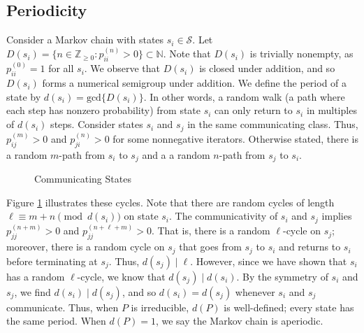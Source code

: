 \documentclass[11pt,letterpaper]{amsart}
\newcommand{\iterate}[2]{#1^{(#2)}}
\begin{document}
\subsection{Periodicity}
Consider a Markov chain with states $s_i \in \mathcal{S}$. Let
$D(s_i) = \{n\in \mathbb{Z}_{\geq 0} : \iterate{p}{n}_{ii} > 0 \} \subset
\mathbb{N}$. Note that $D(s_i)$ is trivially nonempty, as
$\iterate{p}{0}_{ii} = 1$ for all $s_i$. We observe that $D(s_i)$ is closed
under addition, and so $D(s_i)$ forms a numerical semigroup under addition. We
define the period of a state by $d(s_i)=\text{gcd}\{D(s_i)\}$. In other words, a
random walk (a path where each step has nonzero probability) from state $s_i$
can only return to $s_i$ in multiples of $d(s_i)$ steps. Consider states $s_i$
and $s_j$ in the same communicating class. Thus, $\iterate{p}{m}_{ij} > 0$ and
$\iterate{p}{n}_{ji} > 0$ for some nonnegative iterators. Otherwise stated,
there is a random $m$-path from $s_i$ to $s_j$ and a a random $n$-path from
$s_j$ to $s_i$.
\begin{figure}[h]
  \centering {}
  \caption{Communicating States}
  \label{fig:markov}
\end{figure}

Figure \ref{fig:markov} illustrates these cycles. Note that there are random
cycles of length $\ell \equiv m+n \pmod{d(s_i)}$ on state $s_i$. The
communicativity of $s_i$ and $s_j$ implies $\iterate{p}{n+m}_{jj} > 0$ and
$\iterate{p}{n + \ell + m}_{jj} > 0$. That is, there is a random $\ell$-cycle on
$s_j$; moreover, there is a random cycle on $s_j$ that goes from $s_j$ to $s_i$
and returns to $s_i$ before terminating at $s_j$. Thus, $d(s_j) \mid \ell$.
However, since we have shown that $s_i$ has a random $\ell$-cycle, we know that
$d(s_j) \mid d(s_i)$. By the symmetry of $s_i$ and $s_j$, we find
$d(s_i) \mid d(s_j)$, and so $d(s_i) = d(s_j)$ whenever $s_i$ and $s_j$
communicate. Thus, when $P$ is irreducible, $d(P)$ is well-defined; every state
has the same period. When $d(P) = 1$, we say the Markov chain is aperiodic.
\end{document}
